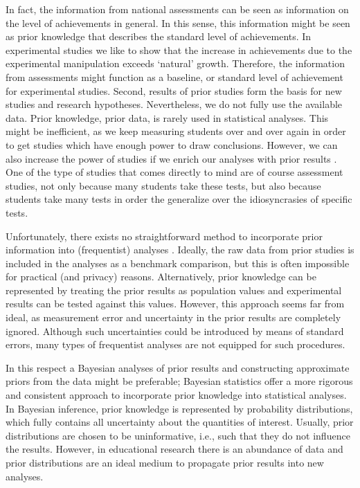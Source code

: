 \documentclass[a4paper]{article}
\newcommand{\DON}	[1] 	{\todo[linecolor=gray, backgroundcolor=white]	{Don: 	{#1}}}
\begin{document}
In fact, the information from national assessments can be seen as information on the level of achievements in general. In this sense, this information might be seen as prior knowledge that describes the standard level of achievements.  In experimental studies we like to show that the increase in achievements due to the experimental manipulation exceeds `natural' growth. Therefore, the information from assessments might function as a baseline, or standard level of achievement for experimental studies.
Second, results of prior studies form the basis for new studies and research hypotheses. Nevertheless, we do not fully use the available data. Prior knowledge, prior data, is rarely used in statistical analyses. This might be inefficient, as we keep measuring students over and over again in order to get studies which have enough power to draw conclusions. However, we can also increase the power of studies if we enrich our analyses with prior results \cite{graham2014conducting}. One of the type of studies that comes directly to mind are of course assessment studies, not only because many students take these tests, but also because students take many tests in order the generalize over the idiosyncrasies of specific tests.

Unfortunately, there exists no straightforward method to incorporate prior information into (frequentist) analyses \DON{ref, but see ref}. Ideally, the raw data from prior studies is included in the analyses as a benchmark comparison, but this is often impossible for practical (and privacy) reasons. Alternatively, prior knowledge can be represented by treating the prior results as population values and experimental results can be tested against this values. However, this approach seems far from ideal, as measurement error and uncertainty in the prior results are completely ignored. Although such uncertainties could be introduced by means of standard errors, many types of frequentist analyses are not equipped for such procedures.

In \DON{Herschrijf deze alinea.} this respect a Bayesian analyses of prior results and constructing approximate priors from the data might be preferable; Bayesian statistics offer a more rigorous and consistent approach to incorporate prior knowledge into statistical analyses. In Bayesian inference, prior knowledge is represented by probability distributions, which fully contains all uncertainty about the quantities of interest. Usually, prior distributions are chosen to be uninformative, i.e., such that they do not influence the results. However, in educational research there is an abundance of data and prior distributions are an ideal medium to propagate prior results into new analyses.
\end{document}
